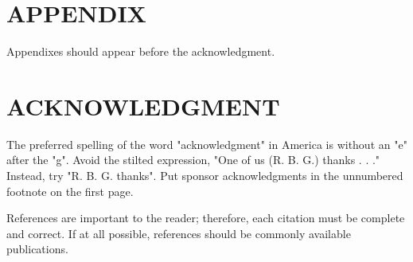 \documentclass[letterpaper, 10 pt, conference]{ieeeconf}  %
\begin{document}
\section*{APPENDIX}

Appendixes should appear before the acknowledgment.

\section*{ACKNOWLEDGMENT}

The preferred spelling of the word "acknowledgment" in America is without an "e" after the "g". Avoid the stilted expression, "One of us (R. B. G.) thanks . . ."  Instead, try "R. B. G. thanks". Put sponsor acknowledgments in the unnumbered footnote on the first page.




References are important to the reader; therefore, each citation must be complete and correct. If at all possible, references should be commonly available publications.
\end{document}
